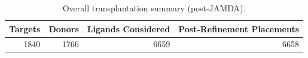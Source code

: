 \begin{table}[ht]
    \centering
    \begin{tabular}{rrrr}
        \toprule
        Targets & Donors & Ligands Considered & Post-Refinement Placements \\
        \midrule
        1840    & 1766   & 6659               & 6658                       \\
        \bottomrule
    \end{tabular}
    \caption[Overall transplantation summary]{Overall transplantation summary (post-JAMDA).}
    \label{tab:overall-summary}
\end{table}
